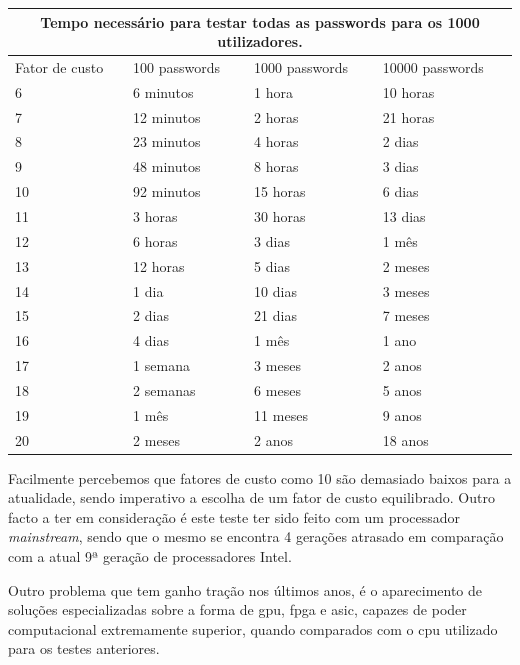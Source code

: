 \begin{center}
    \begin{tabular}{ |p{2.5cm}|p{3cm}|p{3cm}|p{3cm}|  }
        \hline
        \multicolumn{4}{|c|}{Tempo necessário para testar todas as passwords para os 1000 utilizadores.} \\
        \hline
        Fator de custo & 100 passwords & 1000 passwords & 10000 passwords\\
        \hline 
        6 & 6 minutos & 1 hora & 10 horas\\
        7 & 12 minutos & 2 horas & 21 horas\\
        8 & 23 minutos & 4 horas & 2 dias\\
        9 & 48 minutos & 8 horas & 3 dias\\
        10 & 92 minutos & 15 horas & 6 dias\\
        11 & 3 horas & 30 horas & 13 dias\\
        12 & 6 horas & 3 dias & 1 mês\\
        13 & 12 horas & 5 dias & 2 meses\\
        14 & 1 dia & 10 dias & 3 meses\\
        15 & 2 dias & 21 dias & 7 meses\\
        16 & 4 dias & 1 mês & 1 ano\\
        17 & 1 semana & 3 meses & 2 anos\\
        18 & 2 semanas & 6 meses & 5 anos\\
        19 & 1 mês & 11 meses & 9 anos\\
        20 & 2 meses & 2 anos & 18 anos\\
        \hline
    \end{tabular}
\label{tab:bcrypt_bruteforce} 
\end{center}

Facilmente percebemos que fatores de custo como 10 são demasiado baixos para a atualidade, sendo imperativo a escolha de um fator de custo equilibrado. Outro facto a ter em consideração é este teste ter sido feito com um processador \emph{mainstream}, sendo que o mesmo se encontra 4 gerações atrasado em comparação com a atual 9ª geração de processadores Intel.

Outro problema que tem ganho tração nos últimos anos, é o aparecimento de soluções especializadas sobre a forma de \gls{gpu}, \gls{fpga} e \gls{asic}, capazes de poder computacional extremamente superior, quando comparados com o \gls{cpu} utilizado para os testes anteriores.


